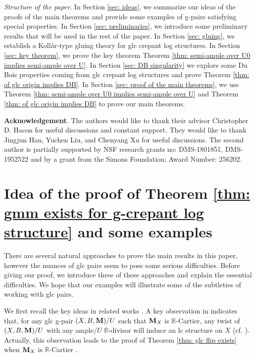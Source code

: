 \documentclass[11pt]{amsart}
\numberwithin{equation}{section}
\newcommand{\Mm}{{\bf{M}}}
\theoremstyle{definition}
\theoremstyle{definition}
\theoremstyle{definition}
\begin{document}
\medskip

\noindent\textit{Structure of the paper}. In Section \ref{sec:
ideas}, we summarize our ideas of the proofs of the main theorems and
provide some examples of g-pairs satisfying special properties. In
Section \ref{sec: preliminaries}, we introduce some preliminary
results that will be used in the rest of the paper. In Section
\ref{sec: gluing}, we establish a Koll\'ar-type gluing theory for glc
crepant log structures. In Section \ref{sec: key theorem}, we prove
the key theorem Theorem \ref{thm: semi-ample over U0 implies
semi-ample over U}. In Section \ref{sec: DB singularity} we explore
some Du Bois properties coming from glc crepant log structures and
prove Theorem \ref{thm: of glc origin implies DB}. In Section
\ref{sec: proof of the main theorems}, we use Theorem \ref{thm:
semi-ample over U0 implies semi-ample over U} and Theorem \ref{thm:
of glc origin implies DB} to prove our main theorems.

\medskip

\noindent\textbf{Acknowledgement}. The authors would like to thank
their advisor Christopher D. Hacon for useful discussions and
constant support. They would like to thank Jingjun Han, Yuchen Liu,
and Chenyang Xu for useful discussions. The second author is
partially supported by NSF research grants no: DMS-1801851,
DMS-1952522 and by a grant from the Simons Foundation; Award Number: 256202.

\section{Idea of the proof of Theorem \ref{thm: gmm exists for
g-crepant log structure} and some examples}\label{sec: ideas}

There are several natural approaches to prove the main results in
this paper, however the nuances of glc pairs seem to pose some
serious difficulties. Before giving our proof, we introduce three of
these approaches and explain the essential difficulties. We hope that
our examples will illustrate some of the subtleties of working with glc pairs.

We first recall the key ideas in related works \cite{HL21a,LX22}. A
key observation in \cite{HL21a} indicates that, for any glc g-pair
$(X,B,\Mm)/U$ such that $\Mm_X$ is $\mathbb R$-Cartier, any twist of
$(X,B,\Mm)/U$ with any ample$/U$ $\mathbb R$-divisor will induce an
lc structure on $X$ (cf. \cite[Lemma 5.18]{HL21a}). Actually, this
observation leads to the proof of Theorem \ref{thm: glc flip exists}
when $\Mm_X$ is $\mathbb R$-Cartier \cite[Theorem 1.2]{HL21a}.
\end{document}
